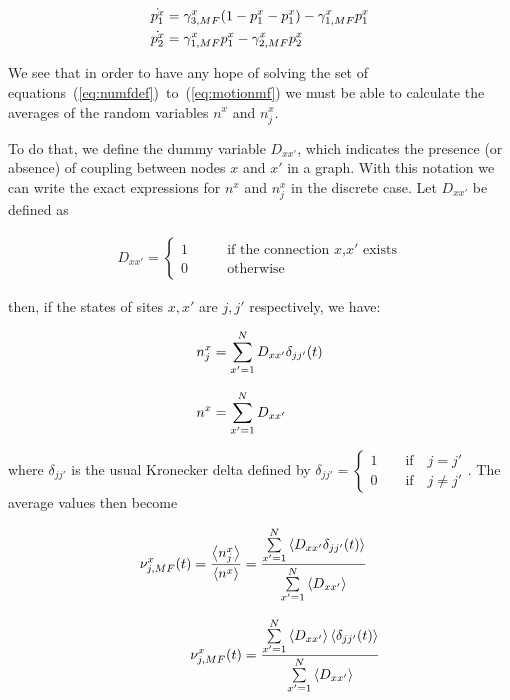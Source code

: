 \begin{align}
    \dot{p^x_1} &= \gamma^x_{3,MF} (1-p^x_1-p^x_1) - \gamma^x_{1,MF} p^x_1 \notag \\
    \dot{p^x_2} &= \gamma^x_{1,MF}  p^x_1 - \gamma^x_{2,MF} p^x_2
    \label{eq:motionmf}
\end{align}

We see that in order to have any hope of solving the set of equations~(\ref{eq:numfdef})~to~(\ref{eq:motionmf}) we must be able to
calculate the averages of the random variables $n^x$ and $n^x_j$.

To do that, we define the dummy variable $D_{xx'}$, which indicates the presence (or absence) of coupling between nodes $x$ and $x'$ in
a graph. With this notation we can write the exact expressions for $n^x$ and $n^x_j$ in the discrete case. Let $D_{xx'}$ be defined as

\begin{align}
    D_{xx'} = 
    \begin{cases}
        1 \qquad &\text{if the connection $x$,$x'$ exists}\\
        0 \qquad &\text{otherwise}
    \end{cases}
\end{align}

\noindent then, if the states of sites $x,x'$ are $j,j'$ respectively, we have:

\begin{align}
    n^x_j &= \sum\limits_{x'=1}^ND_{xx'}\delta_{jj'}(t) \notag\\[8pt]
    n^x &= \sum\limits_{x'=1}^ND_{xx'}
\end{align}

\noindent where $\delta_{jj'}$ is the usual Kronecker delta defined by $\delta_{jj'}=\begin{cases}1 \qquad\text{if}\quad j=j'\\0 \qquad
\text{if}\quad j\neq j'\end{cases}$. The average values then become

\begin{align}
    \nu^x_{j,MF}(t) = \frac{\left<n^x_j\right>}{\left<n^x\right>} &= \frac{\sum\limits_{x'=1}^N\left< D_{xx'}\delta_{jj'}(t)\right>}{\sum\limits_{x'=1}^N\left< D_{xx'} \right>}
    \notag \\[8pt]
    \nu^x_{j,MF}(t) &= \frac{\sum\limits_{x'=1}^N\left< D_{xx'}\right>\left<\delta_{jj'}(t)\right>}{\sum\limits_{x'=1}^N\left< D_{xx'} \right>}
    \label{eq:numf}
\end{align}

